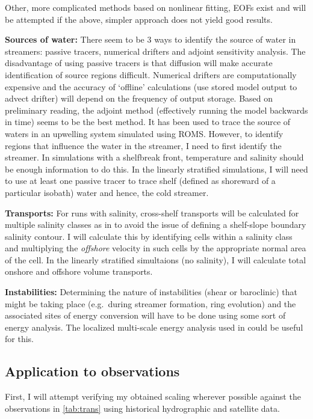 Other, more complicated methods based on nonlinear fitting, EOFs exist \citep[e.g.\ ][]{Wei2008} and will be attempted if the above, simpler approach does not yield good results.

\textbf{Sources of water:} There seem to be 3 ways to identify the source of water in streamers: passive tracers, numerical drifters and adjoint sensitivity analysis. The disadvantage of using passive tracers is that diffusion will make accurate identification of source regions difficult. Numerical drifters are computationally expensive and the accuracy of ‘offline’ calculations (use stored model output to advect drifter) will depend on the frequency of output storage. Based on preliminary reading, the adjoint method (effectively running the model backwards in time) seems to be the best method. It has been used to trace the source of waters in an upwelling system \citep{Chhak2007} simulated using ROMS. However, to identify regions that influence the water in the streamer, I need to first identify the streamer. In simulations with a shelfbreak front, temperature and salinity should be enough information to do this. In the linearly stratified simulations, I will need to use at least one passive tracer to trace shelf (defined as shoreward of a particular isobath) water and hence, the cold streamer.

\textbf{Transports:} For runs with salinity, cross-shelf transports will be calculated for multiple salinity classes as in \cite{Joyce1992} to avoid the issue of defining a shelf-slope boundary salinity contour. I will calculate this by identifying cells within a salinity class and multiplying the \emph{offshore} velocity in such cells by the appropriate normal area of the cell. In the linearly stratified simultaions (no salinity), I will calculate total onshore and offshore volume transports.

\textbf{Instabilities:} Determining the nature of instabilities (shear or baroclinic) that might be taking place (e.g.\ during streamer formation, ring evolution) and the associated sites of energy conversion will have to be done using some sort of energy analysis. The localized multi-scale energy analysis used in \cite{Liang2004} could be useful for this.
 
\subsection{Application to observations}

First, I will attempt verifying my obtained scaling wherever possible against the observations in \cref{tab:trans} using historical hydrographic and satellite data.

